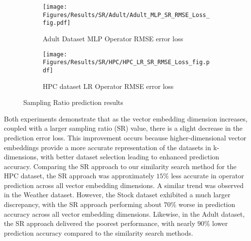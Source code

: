 \begin{figure}[htpb!]
     \centering
     \begin{subfigure}[b]{0.24\textwidth}
         \centering
         \texttt{[image: Figures/Results/SR/Adult/Adult\_MLP\_SR\_RMSE\_Loss\_fig.pdf]}
         \caption{Adult Dataset MLP Operator RMSE error loss}
         \label{fig:Adult-SR-RMSE}
     \end{subfigure}
     \hfill 
     \begin{subfigure}[b]{0.24\textwidth}
         \centering
         \texttt{[image: Figures/Results/SR/HPC/HPC\_LR\_SR\_RMSE\_Loss\_fig.pdf]}
         \caption{HPC dataset LR Operator RMSE error loss}
         \label{fig:Weather-SR-SVM-MAE}
     \end{subfigure}
     \caption{Sampling Ratio prediction results}
        \label{fig:SR-EVAL-RES}
\end{figure}

Both experiments demonstrate that as the vector embedding dimension increases, coupled with a larger sampling ratio (SR) value, there is a slight decrease in the prediction error loss. This improvement occurs because higher-dimensional vector embeddings provide a more accurate representation of the datasets in k-dimensions, with better dataset selection leading to enhanced prediction accuracy. Comparing the SR approach to our similarity search method for the HPC dataset, the SR approach was approximately $15\%$ less accurate in operator prediction across all vector embedding dimensions. A similar trend was observed in the Weather dataset. However, the Stock dataset exhibited a much larger discrepancy, with the SR approach performing about $70\%$ worse in prediction accuracy across all vector embedding dimensions. Likewise, in the Adult dataset, the SR approach delivered the poorest performance, with nearly $90\%$ lower prediction accuracy compared to the similarity search methods.

